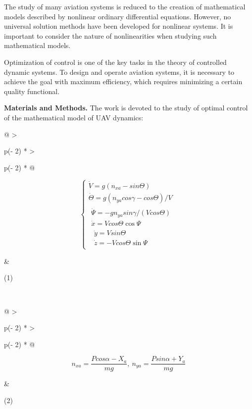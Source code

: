 The study of many aviation systems is reduced to the creation of
mathematical models described by nonlinear ordinary differential
equations. However, no universal solution methods have been developed
for nonlinear systems. It is important to consider the nature of
nonlinearities when studying such mathematical models.

Optimization of control is one of the key tasks in the theory of
controlled dynamic systems. To design and operate aviation systems, it
is necessary to achieve the goal with maximum efficiency, which requires
minimizing a certain quality functional.

{\bfseries Materials and Methods.} The work is devoted to the study of
optimal control of the mathematical model of UAV dynamics:

\begin{longtable}[]{@{}
  >{\raggedright\arraybackslash}p{(\columnwidth - 2\tabcolsep) * }
  >{\raggedright\arraybackslash}p{(\columnwidth - 2\tabcolsep) * }@{}}
\begin{minipage}[b]{\linewidth}\raggedright
\[\left\{ \begin{matrix}
\dot{V} = g(n_{xa} - sin\Theta) \\
\dot{\Theta} = g(n_{ya}cos\gamma - cos\Theta)/V \\
\begin{matrix}
\dot{\Psi} = - gn_{ya}sin\gamma/(Vcos\Theta) \\
\dot{x} = Vcos\Theta\cos\Psi \\
\begin{matrix}
\dot{y} = Vsin\Theta \\
\dot{z} = - Vcos\Theta\sin\Psi
\end{matrix}
\end{matrix}
\end{matrix} \right.\ \]
\end{minipage} & \begin{minipage}[b]{\linewidth}\raggedright
(1)
\end{minipage} \\
\end{longtable}

\begin{longtable}[]{@{}
  >{\raggedright\arraybackslash}p{(\columnwidth - 2\tabcolsep) * }
  >{\raggedright\arraybackslash}p{(\columnwidth - 2\tabcolsep) * }@{}}

\begin{minipage}[b]{\linewidth}\raggedright
\[n_{xa} = \frac{Pcos\alpha - X_{a}}{mg},\ n_{ya} = \frac{Psin\alpha + Y_{a}}{mg}\]
\end{minipage} & \begin{minipage}[b]{\linewidth}\raggedright
(2)
\end{minipage} \\
\end{longtable}

